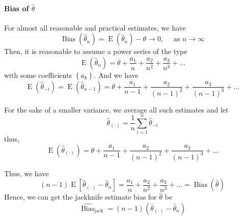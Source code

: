 \paragraph{Bias of $\hat{\theta}$}

For almost all reasonable and practical estimates, we have \begin{equation*}
	\operatorname{Bias}(\hat{\theta}_{n})=\operatorname{E}(\hat{\theta}_{n})-\theta\rightarrow 0,\quad\text{ as }n\rightarrow\infty
\end{equation*}
Then, it is reasonable to assume a power series of the type
\begin{equation*}
	\operatorname{E}(\hat{\theta}_{n})=\theta+\frac{a_{1}}{n}+\frac{a_{2}}{n^{2}}+\frac{a_{3}}{n^{3}}+\ldots
\end{equation*}
with some coefficients $\left\{a_{k}\right\}$. And we have
\begin{equation*}
	\operatorname{E}(\hat{\theta}_{-i})=\operatorname{E}(\hat{\theta}_{n-1})=\theta+\frac{a_{1}}{n-1}+\frac{a_{2}}{\left(n-1\right)^{2}}+\frac{a_{3}}{\left(n-1\right)^{3}}+\ldots
\end{equation*}

For the sake of a smaller variance, we average all such estimates and let
\begin{equation*}
	\hat{\theta}_{(\cdot)}=\frac{1}{n}\sum_{i=1}^{n}\hat{\theta}_{-i}
\end{equation*}
thus,
\begin{equation*}
	\operatorname{E}(\hat{\theta}_{(\cdot)})=\theta+\frac{a_{1}}{n-1}+\frac{a_{2}}{\left(n-1\right)^{2}}+\frac{a_{3}}{\left(n-1\right)^{3}}+\ldots
\end{equation*}

Thus, we have
\begin{equation*}
	(n-1)\operatorname{E}\left[\hat{\theta}_{(\cdot)}-\hat{\theta}_{n}\right]=\frac{a_{1}}{n}+\frac{a_{2}}{n^{2}}+\frac{a_{3}}{n^{3}}+\ldots=\operatorname{Bias}(\hat{\theta})
\end{equation*}
Hence, we can get the jackknife estimate bias for $\hat{\theta}$ be
\begin{equation}
	\widehat{\operatorname{Bias}}_{\text{jack}}=(n-1)\left(\hat{\theta}_{(\cdot)}-\hat{\theta}_{n}\right)
\end{equation}


